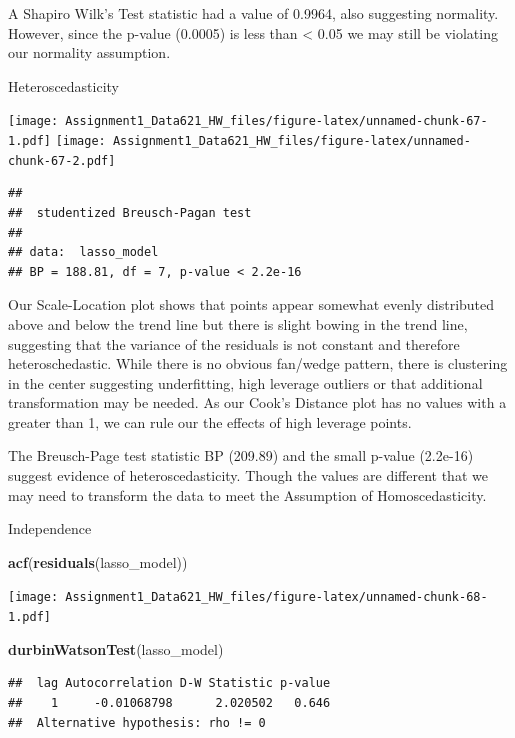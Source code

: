 \documentclass[
]{article}
\newenvironment{Shaded}{\begin{snugshade}}{\end{snugshade}}
\newcommand{\FunctionTok}[1]{\textcolor[rgb]{0.13,0.29,0.53}{\textbf{#1}}}
\newcommand{\NormalTok}[1]{#1}
\begin{document}
A Shapiro Wilk's Test statistic had a value of 0.9964, also suggesting
normality. However, since the p-value (0.0005) is less than \textless{}
0.05 we may still be violating our normality assumption.

Heteroscedasticity

\texttt{[image: Assignment1\_Data621\_HW\_files/figure-latex/unnamed-chunk-67-1.pdf]}
\texttt{[image: Assignment1\_Data621\_HW\_files/figure-latex/unnamed-chunk-67-2.pdf]}

\begin{verbatim}
## 
##  studentized Breusch-Pagan test
## 
## data:  lasso_model
## BP = 188.81, df = 7, p-value < 2.2e-16
\end{verbatim}

Our Scale-Location plot shows that points appear somewhat evenly
distributed above and below the trend line but there is slight bowing in
the trend line, suggesting that the variance of the residuals is not
constant and therefore heteroschedastic. While there is no obvious
fan/wedge pattern, there is clustering in the center suggesting
underfitting, high leverage outliers or that additional transformation
may be needed. As our Cook's Distance plot has no values with a greater
than 1, we can rule our the effects of high leverage points.

The Breusch-Page test statistic BP (209.89) and the small p-value
(2.2e-16) suggest evidence of heteroscedasticity. Though the values are
different that we may need to transform the data to meet the Assumption
of Homoscedasticity.

Independence

\begin{Shaded}
\begin{Highlighting}[]
\FunctionTok{acf}\NormalTok{(}\FunctionTok{residuals}\NormalTok{(lasso\_model))}
\end{Highlighting}
\end{Shaded}

\texttt{[image: Assignment1\_Data621\_HW\_files/figure-latex/unnamed-chunk-68-1.pdf]}

\begin{Shaded}
\begin{Highlighting}[]
\FunctionTok{durbinWatsonTest}\NormalTok{(lasso\_model)}
\end{Highlighting}
\end{Shaded}

\begin{verbatim}
##  lag Autocorrelation D-W Statistic p-value
##    1     -0.01068798      2.020502   0.646
##  Alternative hypothesis: rho != 0
\end{verbatim}
\end{document}
